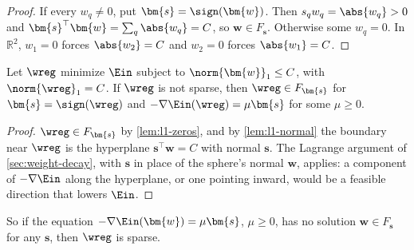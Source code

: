\begin{proof}
    If every \(w_q \neq 0\), put \(\bm{s} = \sign(\bm{w})\). Then \(s_q w_q =
    \abs{w_q} > 0\) and \(\bm{s}^\top \bm{w} = \sum_q \abs{w_q} = C\), so
    \(\bm{w} \in F_{\bm{s}}\). Otherwise some \(w_q = 0\). In \(\mathbb{R}^2\),
    \(w_1 = 0\) forces \(\abs{w_2} = C\) and \(w_2 = 0\) forces \(\abs{w_1} =
    C\).
\end{proof}

\begin{proposition}\label{prop:l1-face-opt}
    Let \(\wreg\) minimize \(\Ein\) subject to \(\norm{\bm{w}}_1 \le C\), with
    \(\norm{\wreg}_1 = C\). If \(\wreg\) is not sparse, then \(\wreg \in
    F_{\bm{s}}\) for \(\bm{s} = \sign(\wreg)\) and \(-\nabla \Ein(\wreg) = \mu
    \bm{s}\) for some \(\mu \ge 0\).
\end{proposition}

\begin{proof}
    \(\wreg \in F_{\bm{s}}\) by \autoref{lem:l1-zeros}, and by
    \autoref{lem:l1-normal} the boundary near \(\wreg\) is the hyperplane
    \(\bm{s}^\top \bm{w} = C\) with normal \(\bm{s}\). The Lagrange argument of
    \autoref{sec:weight-decay}, with \(\bm{s}\) in place of the sphere's normal
    \(\bm{w}\), applies: a component of \(-\nabla \Ein\) along the hyperplane,
    or one pointing inward, would be a feasible direction that lowers
    \(\Ein\).
\end{proof}

So if the equation \(-\nabla \Ein(\bm{w}) = \mu \bm{s}\), \(\mu \ge 0\), has no
solution \(\bm{w} \in F_{\bm{s}}\) for any \(\bm{s}\), then \(\wreg\) is sparse.

